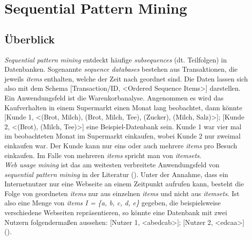 \section{Sequential Pattern Mining}\label{spm}

\subsection{Überblick}

\textit{Sequential pattern mining} entdeckt häufige \textit{subsequences} (dt. Teilfolgen) in Datenbanken. Sogenannte \textit{sequence databases} bestehen aus Transaktionen, die jeweils \textit{items} enthalten, welche der Zeit nach geordnet sind. Die Daten lassen sich also mit dem Schema [Transaction/ID, <Ordered Sequence Items>] darstellen.\\
Ein Anwendungsfeld ist die Warenkorbanalyse. Angenommen es wird das Kaufverhalten in einem Supermarkt einen Monat lang beobachtet, dann könnte [Kunde 1, <(Brot, Milch), (Brot, Milch, Tee), (Zucker), (Milch, Salz)>]; [Kunde 2, <(Brot), (Milch, Tee)>] eine Beispiel-Datenbank sein. Kunde 1 war vier mal im beobachteten Monat im Supermarkt einkaufen, wobei Kunde 2 nur zweimal einkaufen war. Der Kunde kann nur eins oder auch mehrere \textit{items} pro Besuch einkaufen. Im Falle von mehreren \textit{items} spricht man von \textit{itemsets}.\\
\textit{Web usage mining} ist das am weitesten verbreitete Anwendungsfeld von \textit{sequential pattern mining} in der Literatur (\cite{lu_ezeife,wang_han,goethals}). Unter der Annahme, dass ein Internetnutzer nur eine Webseite an einem Zeitpunkt aufrufen kann, besteht die Folge von geordneten \textit{items} nur aus einzelnen \textit{items} und nicht aus \textit{itemsets}. Ist also eine Menge von \textit{items I = \{a, b, c, d, e\}} gegeben, die beispielsweise verschiedene Webseiten repräsentieren, so könnte eine Datenbank mit zwei Nutzern folgendermaßen aussehen: [Nutzer 1, <abedcab>]; [Nutzer 2, <edcaa>] (\cite[3:1-3:2]{taxonomy}).

